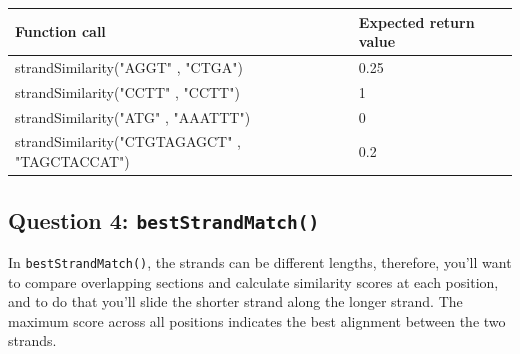 \begin{sampleProject}
    \hspace{0pt}
    \begin{longtable}{|p{3.0in}|p{2.5in}|}
        \hline
        \textbf{Function call}
            & 
            \textbf{Expected return value}
            \\ \hline
        
        strandSimilarity("AGGT" , "CTGA")
            & 
            0.25
            \\ \hline
        
        strandSimilarity("CCTT" , "CCTT")
            & 
            1
            \\ \hline
        
        strandSimilarity("ATG" , "AAATTT")
            & 
            0
            \\ \hline

        strandSimilarity("CTGTAGAGCT" , "TAGCTACCAT")
            & 
            0.2
            \\ \hline
    \end{longtable}
\end{sampleProject}

\hspace{2pt}

\subsection{Question 4: \texttt{bestStrandMatch()}}

In \texttt{bestStrandMatch()}, the strands can be different lengths, therefore, you'll want to compare overlapping sections and calculate similarity scores at each position, and to do that you'll slide the shorter strand along the longer strand. The maximum score across all positions indicates the best alignment between the two strands.

